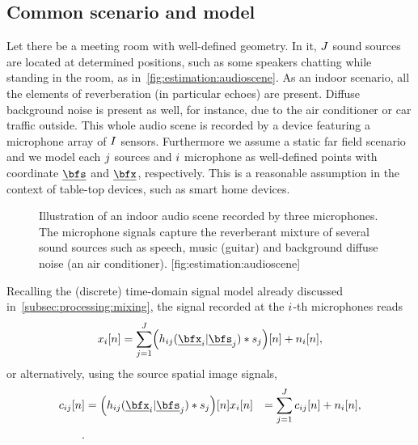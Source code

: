 \subsection{Common scenario and model}
Let there be a meeting room with well-defined geometry.
In it, $J$ sound sources are located at determined positions, such as some speakers chatting while standing in the room, as in~\cref{fig:estimation:audioscene}.
As an indoor scenario, all the elements of reverberation (in particular echoes) are present.
Diffuse background noise is present as well, for instance, due to the air conditioner or car traffic outside.
This whole audio scene is recorded by a device featuring a microphone array of $I$ sensors.
Furthermore we assume a static far field scenario and we model each $j$ sources and $i$ microphone as well-defined points with coordinate $\positionSource$ and $\positionMicrophone$, respectively.
This is a reasonable assumption in the context of table-top devices, such as smart home devices.
\begin{figure}[]
    \begin{sidecaption}{%
        Illustration of an indoor audio scene recorded by three microphones.
        The microphone signals capture the reverberant mixture of several sound sources such as speech, music (guitar) and background diffuse noise (an air conditioner).
    }[fig:estimation:audioscene]
    \centering
    \resizebox{\linewidth}{!}{}
    \end{sidecaption}
\end{figure}
Recalling the (discrete) time-domain signal model already discussed in~\cref{subsec:processing:mixing}, the signal recorded at the $i$-th microphones reads
\begin{equation}
    \label{eq:application:mix}
    \mic_\idxMic[n] = \sum_{\idxSrc = 1}^{\numSrcs}
        \kparen{\flt_{\idxMicSrc}( \positionMicrophone_{\idxMic}  | \positionSource_{\idxSrc}) \convDis \src_{\idxSrc}} [n] + \nse_\idxMic[n]
    ,
\end{equation}
or alternatively, using the source spatial image signals,
\begin{equation}
    \label{eq:application:mix_img}
    \begin{aligned}
        \img_{\idxMicSrc}[n]  &= \kparen{\flt_{\idxMicSrc}( \positionMicrophone_{\idxMic}  | \positionSource_{\idxSrc}) \convDis \src_{\idxSrc}}[n]
        \mic_\idxMic[n]     &= \sum_{\idxSrc = 1}^{\numSrcs} \img_{\idxMicSrc}[n] + \nse_\idxMic[n],\\
        .
    \end{aligned}
\end{equation}
